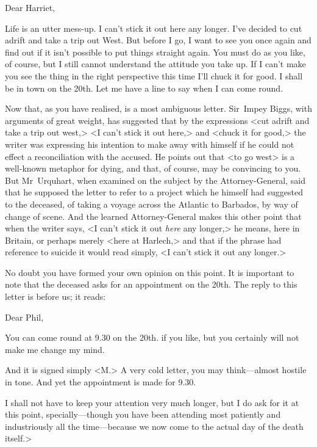 \begin{mail}{}{Dear Harriet,}

Life is an utter mess-up. I can't stick it out here any longer. I've decided to cut adrift and take a trip out West. But before I go, I want to see you once again and find out if it isn't possible to put things straight again. You must do as you like, of course, but I still cannot understand the attitude you take up. If I can't make you see the thing in the right perspective this time I'll chuck it for good. I shall be in town on the 20th. Let me have a line to say when I can come round.

\end{mail}

Now that, as you have realised, is a most ambiguous letter. Sir~Impey Biggs, with arguments of great weight, has suggested that by the expressions <cut adrift and take a trip out west,> <I can't stick it out here,> and <chuck it for good,> the writer was expressing his intention to make away with himself if he could not effect a reconciliation with the accused. He points out that <to go west> is a well-known metaphor for dying, and that, of course, may be convincing to you. But Mr~Urquhart, when examined on the subject by the Attorney-General, said that he supposed the letter to refer to a project which he himself had suggested to the deceased, of taking a voyage across the Atlantic to Barbados, by way of change of scene. And the learned Attorney-General makes this other point that when the writer says, <I can't stick it out \textit{here} any longer,> he means, here in Britain, or perhaps merely <here at Harlech,> and that if the phrase had reference to suicide it would read simply, <I can't stick it out any longer.>

No doubt you have formed your own opinion on this point. It is important to note that the deceased asks for an appointment on the 20th. The reply to this letter is before us; it reads:

\begin{mail}{}{Dear Phil,}

You can come round at 9.30 on the 20th. if you like, but you certainly will not make me change my mind.
\end{mail}

And it is signed simply <M\@.> A very cold letter, you may think—almost hostile in tone. And yet the appointment is made for 9.30.

I shall not have to keep your attention very much longer, but I do ask for it at this point, specially—though you have been attending most patiently and industriously all the time—because we now come to the actual day of the death itself.>

